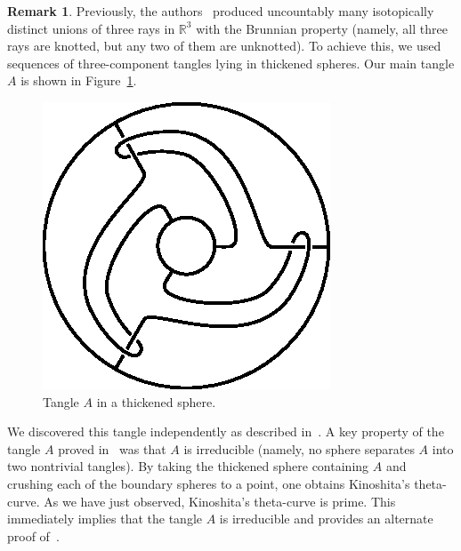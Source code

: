 \documentclass{amsart}
\numberwithin{equation}{section}
\theoremstyle{definition}
\newtheorem{remark}[theorem]{Remark}
\def\R{\ensuremath{\mathbb{R}}}
\begin{document}
\begin{remark}
Previously, the authors~\cite{CMBRS14} produced uncountably many isotopically distinct unions of three rays in $\R^3$ with the Brunnian property (namely, all three rays are knotted, but any two of them are unknotted).
To achieve this, we used sequences of three-component tangles lying in thickened spheres.
Our main tangle $A$ is shown in Figure~\ref{fig:block_A}.
\begin{figure}[htbp]
   \centering
   \includegraphics[scale=1.0]{block_A.eps}
   \caption{Tangle $A$ in a thickened sphere.}
   \label{fig:block_A}
\end{figure}
We discovered this tangle independently as described in~\cite{CMBRS14}.
A key property of the tangle $A$ proved in~\cite{CMBRS14} was that $A$ is irreducible (namely, no sphere separates $A$ into two nontrivial tangles).
By taking the thickened sphere containing $A$ and crushing each of the boundary spheres to a point, one obtains Kinoshita's theta-curve. As we have just observed, Kinoshita's theta-curve is prime. This immediately implies that the tangle $A$ is irreducible and provides an alternate proof of~\cite[Theorem 6.1]{CMBRS14}.
\end{remark}
\end{document}
